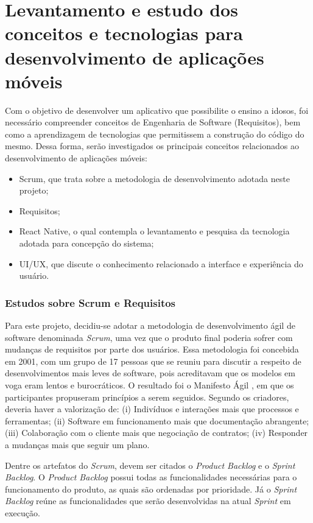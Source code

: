 \section{Levantamento e estudo dos conceitos e tecnologias para desenvolvimento de aplicações móveis}

Com o objetivo de desenvolver um aplicativo que possibilite o ensino a idosos, foi necessário compreender conceitos de Engenharia de Software (Requisitos), bem como a aprendizagem de tecnologias que permitissem a construção do código do mesmo. Dessa forma, serão investigados os principais conceitos relacionados ao desenvolvimento de aplicações móveis: 

\begin{itemize}
    \item Scrum, que trata sobre a metodologia de desenvolvimento adotada neste projeto;
    \item Requisitos;
    \item React Native, o qual contempla o levantamento e pesquisa da tecnologia adotada para concepção do sistema;
    \item UI/UX, que discute o conhecimento relacionado a interface e experiência do usuário.
\end{itemize}

\subsubsection{Estudos sobre Scrum e Requisitos} 
Para este projeto, decidiu-se adotar a metodologia de desenvolvimento ágil de software denominada \textit{Scrum}, uma vez que o produto final poderia sofrer com mudanças de requisitos por parte dos usuários. Essa metodologia foi concebida em 2001, com um grupo de 17 pessoas que se reuniu para discutir a respeito de desenvolvimentos mais leves de software, pois acreditavam que os modelos em voga eram lentos e burocráticos. O resultado foi o Manifesto Ágil \citep{agileManifesto}, em que os participantes propuseram princípios a serem seguidos. Segundo os criadores, deveria haver a valorização de: (i) Indivíduos e interações mais que processos e ferramentas; (ii) Software em funcionamento mais que documentação abrangente; (iii) Colaboração com o cliente mais que negociação de contratos; (iv) Responder a mudanças mais que seguir um plano.

Dentre os artefatos do \textit{Scrum}, devem ser citados o \textit{Product Backlog} e o \textit{Sprint Backlog}. O \textit{Product Backlog} possui todas as funcionalidades necessárias para o funcionamento do produto, as quais são ordenadas por prioridade. Já o \textit{Sprint Backlog} reúne as funcionalidades que serão desenvolvidas na atual \textit{Sprint} em execução.

